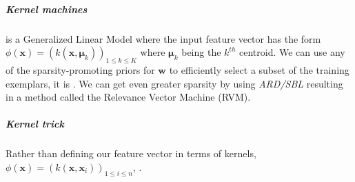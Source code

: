 \subparagraph{Kernel machines}
is a Generalized Linear Model where the input feature vector has the form $\phi(\bm{x}) = \left(
k(\bm{x}, \bm{\mu}_{k})\right)_{1\leq k\leq K}$ where $\bm{\mu}_{k}$ being the $k^{th}$ 
centroid.
We can use any of the sparsity-promoting priors for $\bm{w}$ to efficiently select a 
subset of the training exemplars, it is .
We can get even greater sparsity by using \emph{ARD/SBL} resulting in a method called
the Relevance Vector Machine (RVM).
\subparagraph{Kernel trick}
Rather than defining our feature vector in terms of kernels, $\phi(\bm{x}) = \left(
k(\bm{x},\bm{x}_{i})\right)_{1\leq i\leq n}$, .

